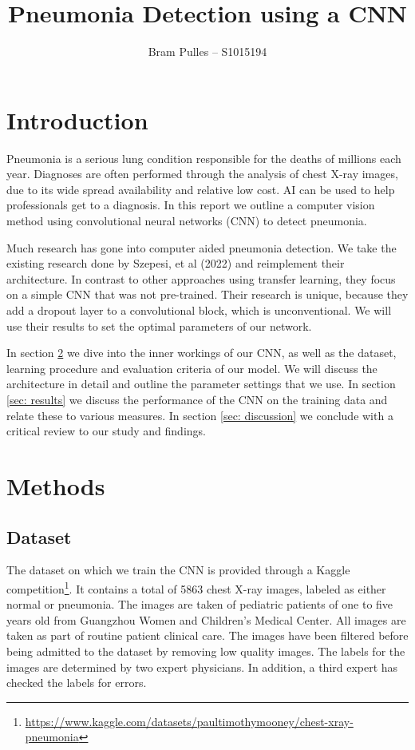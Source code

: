 \documentclass[a4paper]{article}
\title{\textbf{Pneumonia Detection using a CNN}}
\author{Bram Pulles -- S1015194}
\begin{document}
\maketitle

\section{Introduction}

Pneumonia is a serious lung condition responsible for the deaths of millions
each year. Diagnoses are often performed through the analysis of chest X-ray
images, due to its wide spread availability and relative low cost. AI can be
used to help professionals get to a diagnosis. In this report we outline a
computer vision method using convolutional neural networks (CNN) to detect
pneumonia.

Much research has gone into computer aided pneumonia detection. We take the
existing research done by Szepesi, et al (2022) and reimplement their
architecture. In contrast to other approaches using transfer learning, they
focus on a simple CNN that was not pre-trained. Their research is unique,
because they add a dropout layer to a convolutional block, which is
unconventional. We will use their results to set the optimal parameters of our
network.

In section \ref{sec: methods} we dive into the inner workings of our CNN, as
well as the dataset, learning procedure and evaluation criteria of our model.
We will discuss the architecture in detail and outline the parameter settings
that we use. In section \ref{sec: results} we discuss the performance of the
CNN on the training data and relate these to various measures. In section
\ref{sec: discussion} we conclude with a critical review to our study and
findings.

\section{Methods}\label{sec: methods}

\subsection{Dataset}

The dataset on which we train the CNN is provided through a Kaggle
competition\footnote{\url{https://www.kaggle.com/datasets/paultimothymooney/chest-xray-pneumonia}}.
It contains a total of 5863 chest X-ray images, labeled as either normal or
pneumonia. The images are taken of pediatric patients of one to five years old
from Guangzhou Women and Children's Medical Center. All images are taken as
part of routine patient clinical care. The images have been filtered before
being admitted to the dataset by removing low quality images. The labels for
the images are determined by two expert physicians. In addition, a third expert
has checked the labels for errors.
\end{document}
